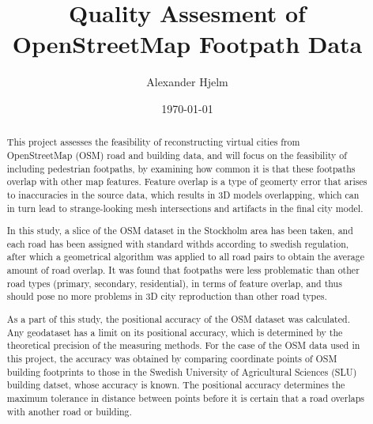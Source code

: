 \documentclass{kththesis}
\title{Quality Assesment of OpenStreetMap Footpath Data}
\author{Alexander Hjelm}
\date{\today}
\begin{document}
\frontmatter

\titlepage

\begin{abstract}
This project assesses the feasibility of reconstructing virtual cities from OpenStreetMap (OSM) road and building data, and will focus on the feasibility of including pedestrian footpaths, by examining how common it is that these footpaths overlap with other map features.
Feature overlap is a type of geomerty error that arises to inaccuracies in the source data, which results in 3D models overlapping, which can in turn lead to strange-looking mesh intersections and artifacts in the final city model.

In this study, a slice of the OSM dataset in the Stockholm area has been taken, and each road has been assigned with standard withds according to swedish regulation, after which a geometrical algorithm was applied to all road pairs to obtain the average amount of road overlap.
It was found that footpaths were less problematic than other road types (primary, secondary, residential), in terms of feature overlap, and thus should pose no more problems in 3D city reproduction than other road types.

As a part of this study, the positional accuracy of the OSM dataset was calculated.
Any geodataset has a limit on its positional accuracy, which is determined by the theoretical precision of the measuring methods.
For the case of the OSM data used in this project, the accuracy was obtained by comparing coordinate points of OSM building footprints to those in the Swedish University of Agricultural Sciences (SLU) building datset, whose accuracy is known.
The positional accuracy determines the maximum tolerance in distance between points before it is certain that a road overlaps with another road or building.

\end{abstract}
\end{document}
